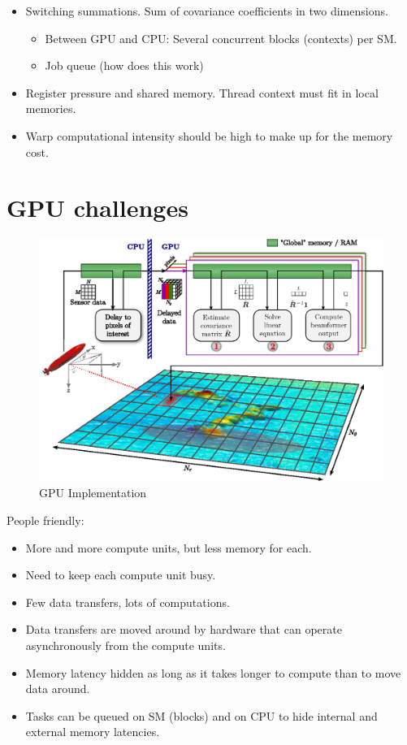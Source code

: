 \documentclass[12pt,journal,captionsoff,onecolumn]{IEEEtran}
\let\MYoriglatexcaption\caption               %
\renewcommand{\caption}[2][\relax]{\MYoriglatexcaption[#2]{#2}}
\newcommand\1{\vec 1}
\begin{document}
\begin{itemize}
\item Switching summations. Sum of covariance coefficients in two dimensions.
\begin{itemize}
\item Between GPU and CPU: Several concurrent blocks (contexts) per SM.
\item Job queue (how does this work)
\end{itemize}
\item Register pressure and shared memory. Thread context must fit in local memories.
\item Warp computational intensity should be high to make up for the memory cost.
\end{itemize}


\section{GPU challenges}

\begin{figure}[!t]\centering
\includegraphics[width=\linewidth]{gfx/implementation.eps}
\caption{GPU Implementation}
\label{implementation}
\end{figure}

People friendly:
\begin{itemize}
\item More and more compute units, but less memory for each.
\item Need to keep each compute unit busy.
\item Few data transfers, lots of computations.
\item Data transfers are moved around by hardware that can operate asynchronously from the compute units.
\item Memory latency hidden as long as it takes longer to compute than to move data around.
\item Tasks can be queued on SM (blocks) and on CPU to hide internal and external memory latencies.
\end{itemize}
\end{document}
